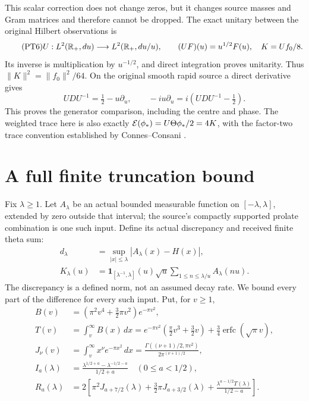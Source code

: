 \documentclass[11pt]{article}
\begin{document}
This scalar correction does not change zeros, but it changes
source masses and Gram matrices and therefore cannot be dropped.
The exact unitary between the original Hilbert observations is
\begin{equation}\tag{PT6}
 U:L^2(\mathbb R_+,du)\longrightarrow L^2(\mathbb R_+,du/u),\qquad
 (UF)(u)=u^{1/2}F(u),\quad K=Uf_0/8.
\end{equation}
Its inverse is multiplication by $u^{-1/2}$, and direct integration
proves unitarity. Thus $\|K\|^2=\|f_0\|^2/64$.
On the original smooth rapid source a direct derivative gives
\begin{equation}\tag{PT7}
 UDU^{-1}=\tfrac12-u\partial_u,
 \qquad -iu\partial_u=i(UDU^{-1}-\tfrac12).
\end{equation}
This proves the generator comparison, including the centre and phase.
The weighted trace here is also exactly
$\mathcal E(\phi_*)=U\Theta\phi_*/2=4K$, with the factor-two trace
convention established by Connes--Consani \cite{swtheta:Hochschild}.

\section{A full finite truncation bound}
Fix $\lambda\geq1$. Let $A_\lambda$ be an actual bounded measurable function
on $[-\lambda,\lambda]$, extended by zero outside that interval;
the source's compactly supported prolate combination is one such
input. Define its actual discrepancy and received finite theta sum:
\begin{equation}\tag{PT8}
 \begin{split}
 d_\lambda&=\sup_{|x|\leq\lambda}|A_\lambda(x)-H(x)|,\\
 K_\lambda(u)&=\mathbf1_{[\lambda^{-1},\lambda]}(u)\sqrt u
                 \sum_{1\leq n\leq\lambda/u}A_\lambda(nu).
 \end{split}
\end{equation}
The discrepancy is a defined norm, not an assumed decay rate.
We bound every part of the difference for every such input.
Put, for $v\geq1$,
\begin{equation}\tag{PT9}
 \begin{split}
 B(v)&=(\pi^2v^4+\tfrac32\pi v^2)e^{-\pi v^2},\\
 T(v)&=\int_v^\infty B(x)\,dx
   =e^{-\pi v^2}(\tfrac\pi2v^3+\tfrac32v)
                      +\tfrac34\operatorname{erfc}(\sqrt\pi v),\\
 J_\nu(v)&=\int_v^\infty x^\nu e^{-\pi x^2}\,dx
     =\frac{\Gamma((\nu+1)/2,\pi v^2)}{2\pi^{(\nu+1)/2}},\\
 I_a(\lambda)&=\frac{\lambda^{1/2+a}-\lambda^{-1/2-a}}{1/2+a}
                                     \quad(0\leq a<1/2),\\
 R_a(\lambda)&=2\left[\pi^2J_{a+7/2}(\lambda)
       +\tfrac32\pi J_{a+3/2}(\lambda)
       +\frac{\lambda^{a-1/2}T(\lambda)}{1/2-a}\right].
 \end{split}
\end{equation}
\end{document}
